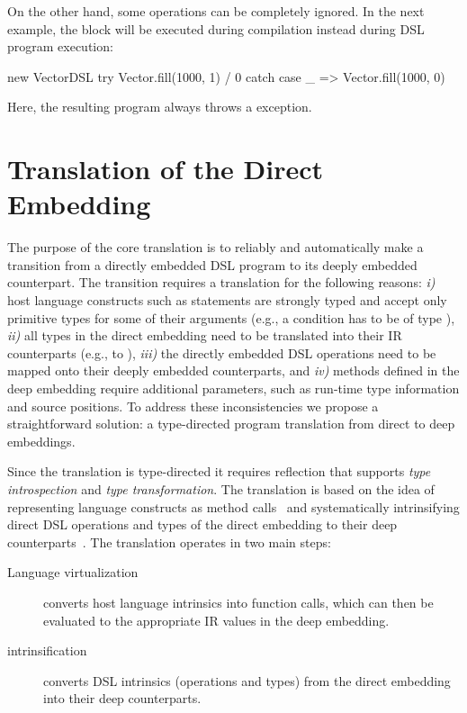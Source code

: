 On the other hand, some operations can be completely ignored. In the next
example, the  block will be executed during \edsl compilation
instead during DSL program execution:\vspace{3pt}

\begin{listingtiny}
  new VectorDSL {
    try Vector.fill(1000, 1) / 0
    catch { case _ => Vector.fill(1000, 0) }
  }
\end{listingtiny}

Here, the resulting program always throws a 
exception.

\section{Translation of the Direct Embedding}
\label{sec:translation}

The purpose of the core \yy translation is to reliably and automatically make
a transition from a directly embedded DSL program to its deeply embedded
counterpart. The transition requires a translation for the following reasons:
\emph{i)} host language constructs such as  statements are strongly
typed and accept only primitive types for some of their arguments (e.g., a
condition has to be of type ), \emph{ii)} all types in the direct
embedding need to be translated into their IR counterparts (e.g.,  to
), \emph{iii)} the directly embedded DSL operations need to be
mapped onto their deeply embedded counterparts, and \emph{iv)} methods defined
in the deep embedding require additional parameters, such as run-time type
information and source positions. To address these inconsistencies we propose a
straightforward solution: a type-directed program translation from direct to
deep embeddings.

Since the translation is type-directed it requires reflection that supports
 \emph{type introspection} and \emph{type transformation}. The translation is based on the idea of representing language constructs as method calls~\cite{carette_finally_2009,rompf_scala-virtualized:_2009} and systematically intrinsifying direct DSL operations and types of the direct embedding to their deep counterparts~\cite{carette_finally_2009}. The translation operates in two main steps:
\begin{description}
\item[Language virtualization] converts host language intrinsics into
  function calls, which can then be evaluated to the appropriate IR
  values in the deep embedding.
\item[\edsl{} intrinsification] converts DSL intrinsics (operations
  and types) from the direct embedding into their deep counterparts.
\end{description}



